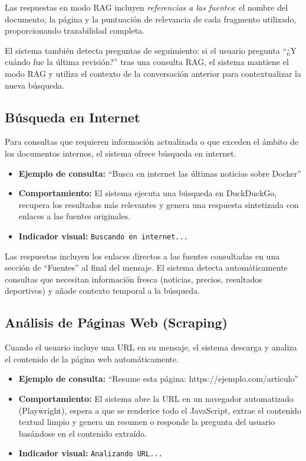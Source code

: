 Las respuestas en modo RAG incluyen \textit{referencias a las fuentes}: el nombre del documento, la página y la puntuación de relevancia de cada fragmento utilizado, proporcionando trazabilidad completa.

El sistema también detecta preguntas de seguimiento: si el usuario pregunta ``¿Y cuándo fue la última revisión?'' tras una consulta RAG, el sistema mantiene el modo RAG y utiliza el contexto de la conversación anterior para contextualizar la nueva búsqueda.

\subsection{Búsqueda en Internet}
\label{subsec:modo-web}

Para consultas que requieren información actualizada o que exceden el ámbito de los documentos internos, el sistema ofrece búsqueda en internet.

\begin{itemize}
    \item \textbf{Ejemplo de consulta:} ``Busca en internet las últimas noticias sobre Docker''
    \item \textbf{Comportamiento:} El sistema ejecuta una búsqueda en DuckDuckGo, recupera los resultados más relevantes y genera una respuesta sintetizada con enlaces a las fuentes originales.
    \item \textbf{Indicador visual:}  \texttt{Buscando en internet...}
\end{itemize}

Las respuestas incluyen los enlaces directos a las fuentes consultadas en una sección de ``Fuentes'' al final del mensaje. El sistema detecta automáticamente consultas que necesitan información fresca (noticias, precios, resultados deportivos) y añade contexto temporal a la búsqueda.

\subsection{Análisis de Páginas Web (Scraping)}
\label{subsec:modo-scraping}

Cuando el usuario incluye una URL en su mensaje, el sistema descarga y analiza el contenido de la página web automáticamente.

\begin{itemize}
    \item \textbf{Ejemplo de consulta:} ``Resume esta página: https://ejemplo.com/articulo''
    \item \textbf{Comportamiento:} El sistema abre la URL en un navegador automatizado (Playwright), espera a que se renderice todo el JavaScript, extrae el contenido textual limpio y genera un resumen o responde la pregunta del usuario basándose en el contenido extraído.
    \item \textbf{Indicador visual:}  \texttt{Analizando URL...}
\end{itemize}

